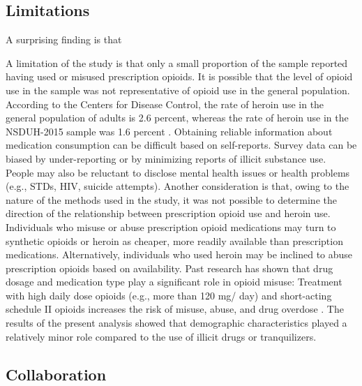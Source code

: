 \documentclass[sigconf]{acmart}
\begin{document}


\subsection{Limitations}

A surprising finding is that 

A limitation of the study is that only a small proportion of the sample 
reported having used or misused prescription opioids. It is possible that the 
level of opioid use in the sample was not representative of opioid use in the 
general population. According to the Centers for Disease Control, the rate
of heroin use in the general population of adults is 2.6 percent, whereas
the rate of heroin use in the NSDUH-2015 sample was 1.6 percent \cite{cdc16}. 
Obtaining reliable information about medication consumption can be difficult 
based on self-reports. Survey data can be biased by under-reporting or by 
minimizing reports of illicit substance use. People may also be reluctant to 
disclose mental health issues or health problems (e.g., STDs, HIV, suicide 
attempts). Another consideration is that, owing to the nature of the methods 
used in the study, it was not possible to determine the direction of the 
relationship between prescription opioid use and heroin use. Individuals who 
misuse or abuse prescription opioid medications may turn to synthetic opioids 
or heroin as cheaper, more readily available than prescription medications. 
Alternatively, individuals who used heroin may be inclined to abuse 
prescription opioids based on availability. Past research has shown that drug 
dosage and medication type play a significant role in opioid misuse: Treatment 
with high daily dose opioids (e.g., more than 120 mg/ day) and short-acting 
schedule II opioids increases the risk of misuse, abuse, and drug overdose 
\cite{sullivan10}. The results of the present analysis showed that demographic 
characteristics played a relatively minor role compared to the use of illicit 
drugs or tranquilizers. 


\subsection{Collaboration}
\end{document}
